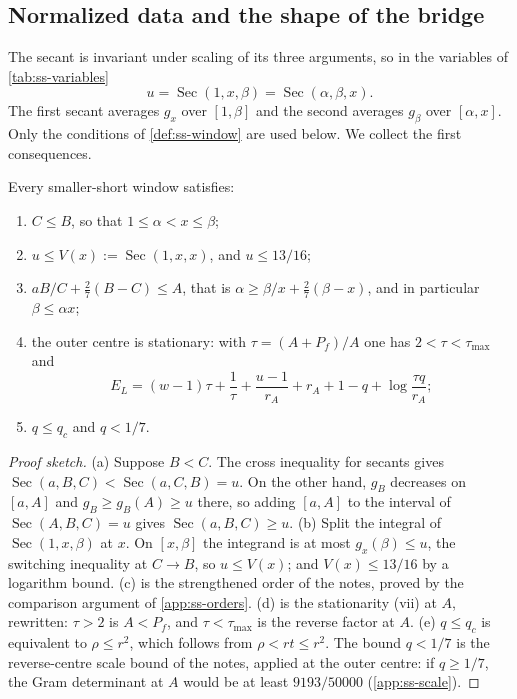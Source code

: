 \subsection{Normalized data and the shape of the bridge}\label{sec:ss-normalized}

The secant is invariant under scaling of its three arguments, so in the variables of
\cref{tab:ss-variables}
\begin{equation}\label{eq:ss-equal-secants}
  u=\operatorname{Sec}(1,x,\beta)=\operatorname{Sec}(\alpha,\beta,x).
\end{equation}
The first secant averages $g_x$ over $[1,\beta]$ and the second averages $g_\beta$ over
$[\alpha,x]$. Only the conditions of \cref{def:ss-window} are used below. We collect the first
consequences.

\begin{lemma}\label{lem:ss-first}
Every smaller-short window satisfies:
\begin{enumerate}[label=(\alph*)]
\item $C\le B$, so that $1\le\alpha<x\le\beta$;
\item $u\le V(x):=\operatorname{Sec}(1,x,x)$, and $u\le13/16$;
\item $aB/C+\frac27(B-C)\le A$, that is $\alpha\ge\beta/x+\frac27(\beta-x)$, and in particular
  $\beta\le\alpha x$;
\item the outer centre is stationary: with $\tau=(A+P_f)/A$ one has $2<\tau<\tau_{\max}$ and
  \begin{equation}\label{eq:ss-root}
    E_L=(w-1)\tau+\frac1\tau+\frac{u-1}{r_A}+r_A+1-q+\log\frac{\tau q}{r_A};
  \end{equation}
\item $q\le q_c$ and $q<1/7$.
\end{enumerate}
\end{lemma}

\begin{proof}[Proof sketch]
(a) Suppose $B<C$. The cross inequality for secants gives
$\operatorname{Sec}(a,B,C)<\operatorname{Sec}(a,C,B)=u$. On the other hand, $g_B$ decreases on $[a,A]$ and
$g_B\ge g_B(A)\ge u$ there, so adding $[a,A]$ to the interval of $\operatorname{Sec}(A,B,C)=u$
gives $\operatorname{Sec}(a,B,C)\ge u$. (b) Split the integral of $\operatorname{Sec}(1,x,\beta)$
at $x$. On $[x,\beta]$ the integrand is at most $g_x(\beta)\le u$, the switching inequality at
$C\to B$, so $u\le V(x)$; and $V(x)\le13/16$ by a logarithm bound. (c) is the strengthened order
of the notes, proved by the comparison argument of \cref{app:ss-orders}. (d) is the
stationarity (vii) at $A$, rewritten: $\tau>2$ is $A<P_f$, and $\tau<\tau_{\max}$ is the reverse
factor at $A$. (e) $q\le q_c$ is equivalent to $\rho\le r^2$, which follows from $\rho<rt\le r^2$.
The bound $q<1/7$ is the reverse-centre scale bound of the notes, applied at the outer centre: if
$q\ge1/7$, the Gram determinant at $A$ would be at least $9193/50000$ (\cref{app:ss-scale}).
\end{proof}

